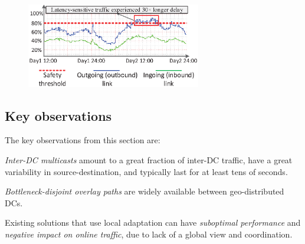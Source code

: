 \begin{figure}[t!]
        \center
        \includegraphics[width=3in]{images/nj02-M2A_0212-0216_v2.eps}
        \label{fig:lesson2}
\vspace{-0.1in}
\end{figure}

\subsection{Key observations}
The key observations from this section are:
\begin{packeditemize}
\item {\em Inter-DC multicasts} amount to a
great fraction of inter-DC traffic,
have a great variability in source-destination, and typically last for at
least tens of seconds.
\item {\em Bottleneck-disjoint overlay paths} are widely available
between geo-distributed DCs.
\item Existing solutions that use local adaptation
can have {\em suboptimal performance} and {\em negative impact on
online traffic}, due to lack of a global view and coordination.
\end{packeditemize}




